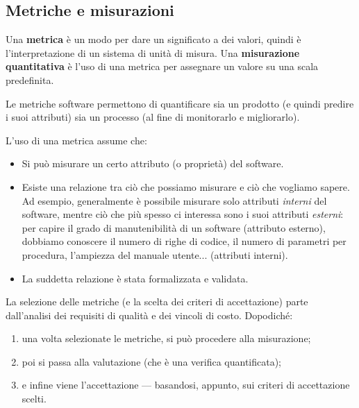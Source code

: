 \documentclass[a4paper]{article}
\begin{document}
		
	\subsection{Metriche e misurazioni}

		
Una \textbf{metrica} è un modo per dare un significato a dei valori, quindi è l'interpretazione di un sistema di unità di misura. Una \textbf{misurazione quantitativa} è l'uso di una metrica per assegnare un valore su una scala predefinita.
		
Le metriche software permettono di quantificare sia un prodotto (e quindi predire i suoi attributi) sia un processo (al fine di monitorarlo e migliorarlo).
		
L'uso di una metrica assume che:
		
	\begin{itemize}
		
			
	\item Si può misurare un certo attributo (o proprietà) del software.
			
	\item Esiste una relazione tra ciò che possiamo misurare e ciò che vogliamo sapere. Ad esempio, generalmente è possibile misurare solo attributi \emph{interni} del software, mentre ciò che più spesso ci interessa sono i suoi attributi \emph{esterni}: per capire il grado di manutenibilità di un software (attributo esterno), dobbiamo conoscere il numero di righe di codice, il numero di parametri per procedura, l'ampiezza del manuale utente... (attributi interni).
			
	\item La suddetta relazione è stata formalizzata e validata.
		
	\end{itemize}

		
La selezione delle metriche (e la scelta dei criteri di accettazione) parte dall'analisi dei requisiti di qualità e dei vincoli di costo. Dopodiché:
		
	\begin{enumerate}
		
			
	\item una volta selezionate le metriche, si può procedere alla misurazione;
			
	\item poi si passa alla valutazione (che è una verifica quantificata);
			
	\item e infine viene l'accettazione --- basandosi, appunto, sui criteri di accettazione scelti.
		
	\end{enumerate}
\end{document}
